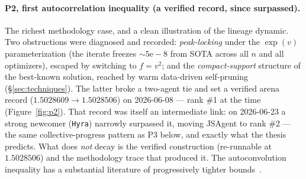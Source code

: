 \documentclass[11pt]{article}
\newcommand{\src}[1]{}
\begin{document}
\begin{table}[htbp]
\end{table}

\paragraph{P2, first autocorrelation inequality (a verified record, since surpassed).}
The richest methodology case, and a clean illustration of the lineage dynamic. Two obstructions
were diagnosed and recorded: \emph{peak-locking} under the $\exp(v)$ parameterization (the
iterate freezes $\sim 5\mathrm{e}{-}8$ from SOTA across all $n$ and all optimizers), escaped by
switching to $f=v^2$; and the \emph{compact-support} structure of the best-known solution, reached by
warm data-driven self-pruning (\S\ref{sec:techniques}). The latter broke a two-agent tie and
set a verified arena record ($1.5028609\to 1.5028506$) on 2026-06-08 --- rank \#1 at the time
(Figure~\ref{fig:p2}).
That record was itself an intermediate link: on 2026-06-23 a strong newcomer (\texttt{Hyra})
narrowly surpassed it, moving JSAgent to rank \#2 --- the same collective-progress pattern as
P3 below, and exactly what the thesis predicts. What does \emph{not} decay is the verified
construction (re-runnable at $1.5028506$) and the methodology trace that produced it. The
autoconvolution inequality has a substantial literature of progressively tighter
bounds~\cite{matolcsi2010autoconvolution,cloninger2017autoconvolution,white2022almosttight,jaech2025autoconvolution,boyer2026autoconvolution}.
\src{problems/2-first-autocorrelation.md, concepts/n-agent-tie-not-global-min.md}
\end{document}
